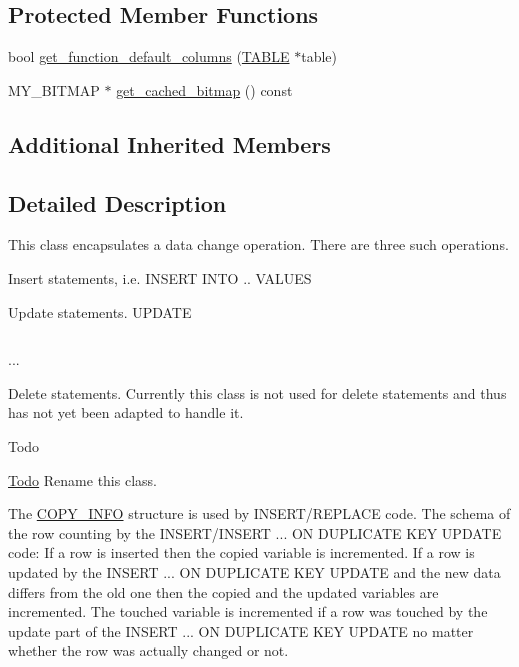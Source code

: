 \subsection*{Protected Member Functions}
\begin{DoxyCompactItemize}
\item 
bool \mbox{\hyperlink{classCOPY__INFO_a4b096071d98443d6f9a59aafc6da78a0}{get\+\_\+function\+\_\+default\+\_\+columns}} (\mbox{\hyperlink{structTABLE}{T\+A\+B\+LE}} $\ast$table)
\item 
M\+Y\+\_\+\+B\+I\+T\+M\+AP $\ast$ \mbox{\hyperlink{classCOPY__INFO_a514b233a8aca96ba77cb73459a112b77}{get\+\_\+cached\+\_\+bitmap}} () const
\end{DoxyCompactItemize}
\subsection*{Additional Inherited Members}


\subsection{Detailed Description}
This class encapsulates a data change operation. There are three such operations.


\begin{DoxyEnumerate}
\item Insert statements, i.\+e. I\+N\+S\+E\+RT I\+N\+TO .. V\+A\+L\+U\+ES
\item Update statements. U\+P\+D\+A\+TE \tabulinesep=1mm
\begin{longtabu}spread 0pt [c]{*{0}{|X[-1]}|}
\hline
\end{longtabu}
...
\item Delete statements. Currently this class is not used for delete statements and thus has not yet been adapted to handle it.
\end{DoxyEnumerate}

\begin{DoxyRefDesc}{Todo}
\item[\mbox{\hyperlink{todo__todo000078}{Todo}}]Rename this class.\end{DoxyRefDesc}


The \mbox{\hyperlink{classCOPY__INFO}{C\+O\+P\+Y\+\_\+\+I\+N\+FO}} structure is used by I\+N\+S\+E\+R\+T/\+R\+E\+P\+L\+A\+CE code. The schema of the row counting by the I\+N\+S\+E\+R\+T/\+I\+N\+S\+E\+RT ... ON D\+U\+P\+L\+I\+C\+A\+TE K\+EY U\+P\+D\+A\+TE code\+: If a row is inserted then the copied variable is incremented. If a row is updated by the I\+N\+S\+E\+RT ... ON D\+U\+P\+L\+I\+C\+A\+TE K\+EY U\+P\+D\+A\+TE and the new data differs from the old one then the copied and the updated variables are incremented. The touched variable is incremented if a row was touched by the update part of the I\+N\+S\+E\+RT ... ON D\+U\+P\+L\+I\+C\+A\+TE K\+EY U\+P\+D\+A\+TE no matter whether the row was actually changed or not. 

